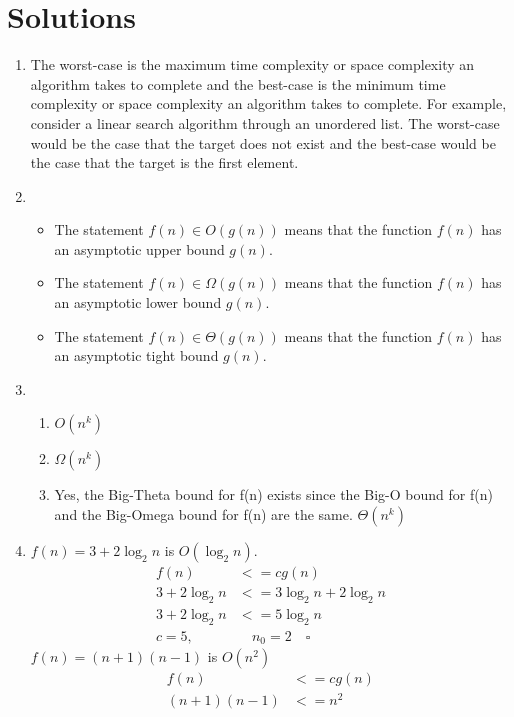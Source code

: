 \newpage

\section{Solutions}

\begin{enumerate}
  \item The worst-case is the maximum time complexity or space complexity an algorithm takes to complete and the best-case is the minimum time complexity or space complexity an algorithm takes to complete.
    For example, consider a linear search algorithm through an unordered list. The worst-case would be the case that the target does not exist and the best-case would be the case that the target is the first element.
  \item
    \begin{itemize}
      \item The statement $f(n) \in O(g(n))$ means that the function $f(n)$ has an asymptotic upper bound $g(n)$.
      \item The statement $f(n) \in \Omega(g(n))$ means that the function $f(n)$ has an asymptotic lower bound $g(n)$.
      \item The statement $f(n) \in \Theta(g(n))$ means that the function $f(n)$ has an asymptotic tight bound $g(n)$.
    \end{itemize}
  \item 
    \begin{enumerate}
      \item $O(n^k)$
      \item $\Omega(n^k)$
      \item Yes, the Big-Theta bound for f(n) exists since the Big-O bound for f(n) and the Big-Omega bound for f(n) are the same. $\Theta(n^k)$
    \end{enumerate}
  \item $f(n) = 3 + 2 \log_{2}{n}$ is $O(\log_{2}{n})$.
    \begin{align*}
      f(n) &<= cg(n) \\
      3 + 2 \log_{2}{n} &<= 3 \log_{2}{n} + 2 \log_{2}{n} \\
      3 + 2 \log_{2}{n} &<= 5 \log_{2}{n} \\ 
      c = 5, & \quad n_0 = 2 \quad \square
    \end{align*}
    $f(n) = (n + 1)(n - 1)$ is $O(n^{2})$
    \begin{align*}
      f(n) &<= cg(n) \\
      (n + 1)(n - 1) &<= n^2 \\

\end{align*}
\end{enumerate}
